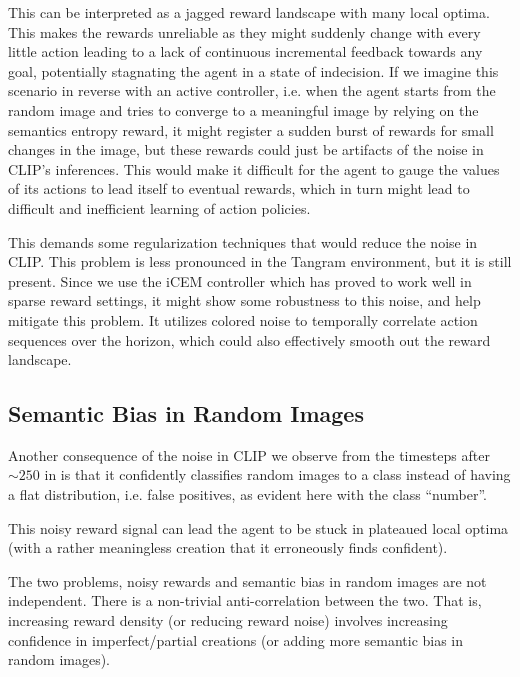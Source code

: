 This can be interpreted as a jagged reward landscape with many local optima.
This makes the rewards unreliable as they might suddenly change with every little action leading to a lack of continuous incremental feedback towards any goal, potentially stagnating the agent in a state of indecision.
If we imagine this scenario in reverse with an active controller, i.e. when the agent starts from the random image and tries to converge to a meaningful image by relying on the semantics entropy reward, it might register a sudden burst of rewards for small changes in the image, but these rewards could just be artifacts of the noise in CLIP's inferences.
This would make it difficult for the agent to gauge the values of its actions to lead itself to eventual rewards, which in turn might lead to difficult and inefficient learning of action policies.

This demands some regularization techniques that would reduce the noise in CLIP.
This problem is less pronounced in the Tangram environment, but it is still present.
Since we use the iCEM controller which has proved to work well in sparse reward settings, it might show some robustness to this noise, and help mitigate this problem.
It utilizes colored noise to temporally correlate action sequences over the horizon, which could also effectively smooth out the reward landscape.


\subsection{Semantic Bias in Random Images} %
\label{sec:inference-noise}
Another consequence of the noise in CLIP we observe from the timesteps after \(\sim 250\) in  is that it confidently classifies random images to a class instead of having a flat distribution, i.e. false positives, as evident here with the class ``number''.

This noisy reward signal can lead the agent to be stuck in plateaued local optima (with a rather meaningless creation that it erroneously finds confident).

The two problems, noisy rewards and semantic bias in random images are not independent.
There is a non-trivial anti-correlation between the two.
That is, increasing reward density (or reducing reward noise) involves increasing confidence in imperfect/partial creations (or adding more semantic bias in random images).


